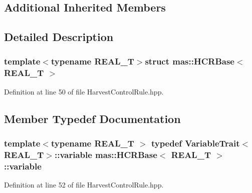 \subsection*{Additional Inherited Members}


\subsection{Detailed Description}
\subsubsection*{template$<$typename R\-E\-A\-L\-\_\-\-T$>$struct mas\-::\-H\-C\-R\-Base$<$ R\-E\-A\-L\-\_\-\-T $>$}



Definition at line 50 of file Harvest\-Control\-Rule.\-hpp.



\subsection{Member Typedef Documentation}
\hypertarget{structmas_1_1_h_c_r_base_a034a831895ed4a6c7224a1f7c4699c08}{
\subsubsection[{variable}]{\setlength{\rightskip}{0pt plus 5cm}template$<$typename R\-E\-A\-L\-\_\-\-T $>$ typedef {\bf Variable\-Trait}$<$R\-E\-A\-L\-\_\-\-T$>$\-::{\bf variable} {\bf mas\-::\-H\-C\-R\-Base}$<$ R\-E\-A\-L\-\_\-\-T $>$\-::{\bf variable}}}\label{structmas_1_1_h_c_r_base_a034a831895ed4a6c7224a1f7c4699c08}


Definition at line 52 of file Harvest\-Control\-Rule.\-hpp.



